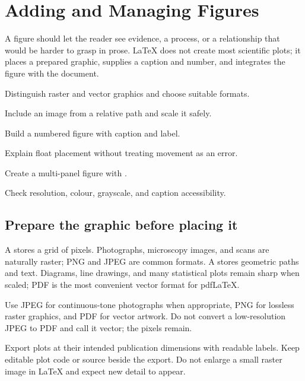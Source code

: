 \chapter{Adding and Managing Figures}
\label{chap:figures}

A figure should let the reader see evidence, a process, or a relationship that
would be harder to grasp in prose. \LaTeX{} does not create most scientific plots;
it places a prepared graphic, supplies a caption and number, and integrates the
figure with the document.

\begin{learningoutcomes}
  \item Distinguish raster and vector graphics and choose suitable formats.
  \item Include an image from a relative path and scale it safely.
  \item Build a numbered figure with caption and label.
  \item Explain float placement without treating movement as an error.
  \item Create a multi-panel figure with .
  \item Check resolution, colour, grayscale, and caption accessibility.
\end{learningoutcomes}

\section{Prepare the graphic before placing it}

A  stores a grid of pixels. Photographs, microscopy images,
and scans are naturally raster; PNG and JPEG are common formats. A
 stores geometric paths and text. Diagrams, line drawings,
and many statistical plots remain sharp when scaled; PDF is the most convenient
vector format for pdf\LaTeX{}.

Use JPEG for continuous-tone photographs when appropriate, PNG for lossless
raster graphics, and PDF for vector artwork. Do not convert a low-resolution
JPEG to PDF and call it vector; the pixels remain.

\begin{goodpractice}
Export plots at their intended publication dimensions with readable labels.
Keep editable plot code or source beside the export. Do not enlarge a small
raster image in \LaTeX{} and expect new detail to appear.
\end{goodpractice}

